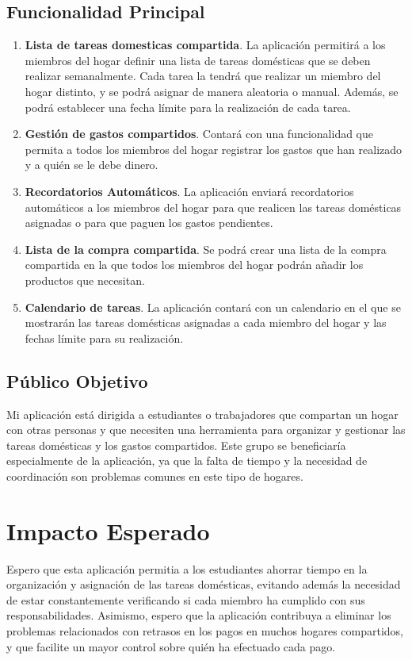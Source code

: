 \documentclass{article}
\begin{document}
\subsection{Funcionalidad Principal}
\begin{enumerate}
    \item \textbf{Lista de tareas domesticas compartida}. La aplicación permitirá a los miembros del hogar definir una lista de tareas domésticas que se deben realizar semanalmente. Cada tarea la tendrá que 
    realizar un miembro del hogar distinto, y se podrá asignar de manera aleatoria o manual. Además, se podrá establecer una fecha límite para la realización de cada tarea.
    \item \textbf{Gestión de gastos compartidos}. Contará con una funcionalidad que permita a todos los miembros del hogar registrar los gastos que han realizado y a quién se le debe dinero.
    \item \textbf{Recordatorios Automáticos}. La aplicación enviará recordatorios automáticos a los miembros del hogar para que realicen las tareas domésticas asignadas o para que paguen los gastos pendientes.
    \item \textbf{Lista de la compra compartida}. Se podrá crear una lista de la compra compartida en la que todos los miembros del hogar podrán añadir los productos que necesitan.
    \item \textbf{Calendario de tareas}. La aplicación contará con un calendario en el que se mostrarán las tareas domésticas asignadas a cada miembro del hogar y las fechas límite para su realización.
\end{enumerate}

\subsection{Público Objetivo}
Mi aplicación está dirigida a estudiantes o trabajadores que compartan un hogar con otras personas y que necesiten una herramienta para organizar y gestionar las tareas domésticas y los gastos compartidos.
Este grupo se beneficiaría especialmente de la aplicación, ya que la falta de tiempo y la necesidad de coordinación son problemas comunes en este tipo de hogares.

\section{Impacto Esperado}

Espero que esta aplicación permitia a los estudiantes ahorrar tiempo en la organización y asignación de las tareas domésticas, 
evitando además la necesidad de estar constantemente verificando si cada miembro ha cumplido con sus responsabilidades. 
Asimismo, espero que la aplicación contribuya a eliminar los problemas relacionados con retrasos en los pagos en muchos hogares compartidos, 
y que facilite un mayor control sobre quién ha efectuado cada pago.
\end{document}
